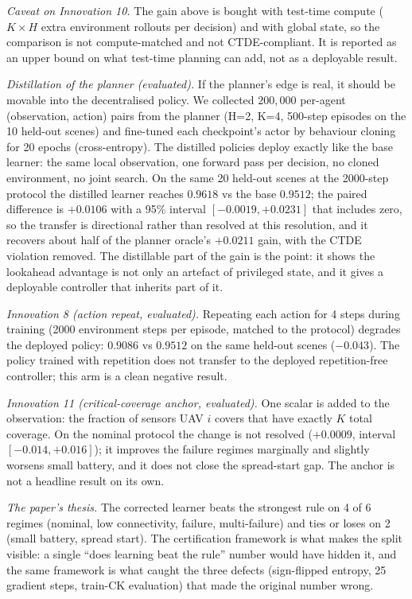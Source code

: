 \documentclass[conference]{IEEEtran}
\begin{document}
\emph{Caveat on Innovation 10.}  The gain above is bought with
test-time compute ($K \times H$ extra environment rollouts per
decision) and with global state, so the comparison is not
compute-matched and not CTDE-compliant.  It is reported as an upper
bound on what test-time planning can add, not as a deployable result.

\emph{Distillation of the planner (evaluated).}  If the planner's
edge is real, it should be movable into the decentralised policy.  We
collected $200{,}000$ per-agent (observation, action) pairs from the
planner (H=2, K=4, 500-step episodes on the 10 held-out scenes) and
fine-tuned each checkpoint's actor by behaviour cloning for 20 epochs
(cross-entropy).  The distilled policies deploy exactly like the base
learner: the same local observation, one forward pass per decision, no
cloned environment, no joint search.  On the same 20 held-out scenes at
the 2000-step protocol the distilled learner reaches $0.9618$ vs the
base $0.9512$; the paired difference is $+0.0106$ with a 95\% interval
$[-0.0019, +0.0231]$ that includes zero, so the transfer is directional
rather than resolved at this resolution, and it recovers about half of
the planner oracle's $+0.0211$ gain, with the CTDE violation removed.
The distillable part of the gain is the point: it shows the lookahead
advantage is not only an artefact of privileged state, and it gives a
deployable controller that inherits part of it.

\emph{Innovation 8 (action repeat, evaluated).}  Repeating each action for
4 steps during training (2000 environment steps per episode, matched to the
protocol) degrades the deployed policy: $0.9086$ vs $0.9512$ on the same
held-out scenes ($-0.043$).  The policy trained with repetition does not
transfer to the deployed repetition-free controller; this arm is a clean
negative result.

\emph{Innovation 11 (critical-coverage anchor, evaluated).}  One scalar is
added to the observation: the fraction of sensors UAV $i$ covers that have
exactly $K$ total coverage.  On the nominal protocol the change is not
resolved ($+0.0009$, interval $[-0.014, +0.016]$); it improves the failure
regimes marginally and slightly worsens small battery, and it does not close
the spread-start gap.  The anchor is not a headline result on its own.

\emph{The paper's thesis.}  The corrected learner beats the strongest rule
on 4 of 6 regimes (nominal, low connectivity, failure, multi-failure) and
ties or loses on 2 (small battery, spread start).  The certification
framework is what makes the split visible: a single ``does learning beat
the rule'' number would have hidden it, and the same framework is what
caught the three defects (sign-flipped entropy, 25 gradient steps,
train-CK evaluation) that made the original number wrong.
\end{document}
